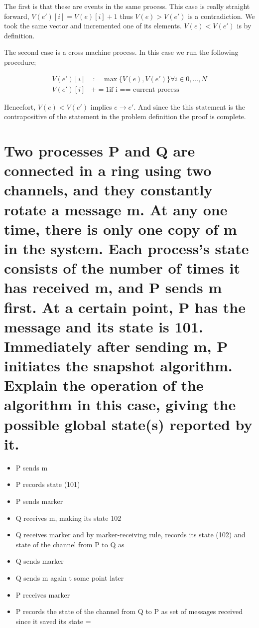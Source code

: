 \documentclass{article}
\begin{document}
The first is that these are events in the same process. This case is really straight forward, $V(e')[i] = V(e)[i] + 1$
thus $V(e) > V(e')$ is a contradiction. We took the same vector and incremented one of its elements. $V(e) < V(e')$ is by definition.

The second case is a cross machine process. In this case we run the following procedure;

\begin{equation}
    \begin{aligned}
        V(e')[i] &:=\max \{ V(e), V(e') \} \forall i \in 0,...,N\\
        V(e')[i] &+= 1 \text{if i == current process} 
    \end{aligned}
\end{equation}

Hencefort, $V(e) < V(e')$ implies $e \rightarrow e'$. And since the this statement is the contrapositive of the statement in the problem definition the proof
is complete.
\section{Two processes P and Q are connected in a ring using two channels, and they constantly
rotate a message m. At any one time, there is only one copy of m in the system. Each
process’s state consists of the number of times it has received m, and P sends m first. At
a certain point, P has the message and its state is 101. Immediately after sending m, P
initiates the snapshot algorithm. Explain the operation of the algorithm in this case,
giving the possible global state(s) reported by it.}

\begin{itemize}
    \item P sends m
    \item P records state (101)
    \item P sends marker
    \item Q receives m, making its state 102
    \item Q receives marker and by marker-receiving rule, records its state (102) and state of the channel from P to Q as {}
    \item Q sends marker
    \item Q sends m again t some point later
    \item P receives marker
    \item P records the state of the channel from Q to P as set of messages received since it saved its state = {}
\end{itemize}
\end{document}
